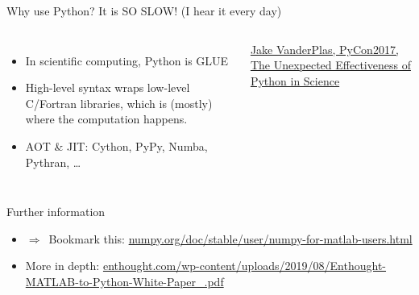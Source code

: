 \documentclass[usepdftitle=false, aspectratio=169]{beamer}
\newcommand{\dra}{\ensuremath{\Rightarrow }~}
\newcommand{\code}[1]{\texttt{\color{mygreen}#1}}
\begin{document}
\begin{frame}
  {Why use Python? It is SO SLOW! (I hear it every day)}

  \begin{columns}
    \begin{itemize}
      \item In scientific computing, \alert{Python is GLUE}
      \item High-level syntax wraps low-level C/Fortran libraries, which is
        (mostly) where the computation happens.
      \item AOT \& JIT: Cython, PyPy, Numba, Pythran, \ldots
    \end{itemize}

  \tiny
  \href{https://files.speakerdeck.com/presentations/1083b290db884f2ab5d04eb98580be94/PyCon_2017.pdf}%
  {Jake VanderPlas, PyCon2017, The Unexpected Effectiveness of Python in
  Science}
  \end{columns}

\end{frame}

\begin{frame}
  {Further information}

  \begin{itemize}\itemsep .5cm
    \item \dra Bookmark this:
      \href{https://numpy.org/doc/stable/user/numpy-for-matlab-users.html}%
      {numpy.org/doc/stable/user/numpy-for-matlab-users.html}
    \item More in depth:
      \href{https://www.enthought.com/wp-content/uploads/2019/08/Enthought-MATLAB-to-Python-White-Paper_.pdf}
      {enthought.com/wp-content/uploads/2019/08/Enthought-MATLAB-to-Python-White-Paper\_.pdf}
  \end{itemize}

\end{frame}

% 
% 
% 
\end{document}
